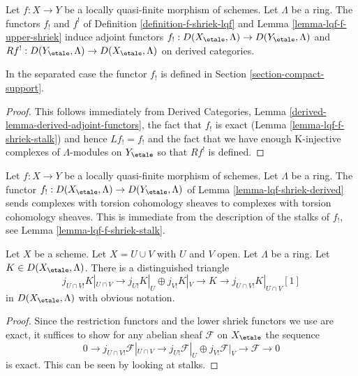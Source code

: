 \begin{lemma}
\label{lemma-lqf-shriek-derived}
Let $f : X \to Y$ be a locally quasi-finite morphism of schemes.
Let $\Lambda$ be a ring. The functors $f_!$ and $f^!$ of
Definition \ref{definition-f-shriek-lqf} and
Lemma \ref{lemma-lqf-f-upper-shriek}
induce adjoint functors $f_! : D(X_\etale, \Lambda) \to D(Y_\etale, \Lambda)$
and $Rf^! : D(Y_\etale, \Lambda) \to D(X_\etale, \Lambda)$
on derived categories.
\end{lemma}

\noindent
In the separated case the functor $f_!$ is defined in
Section \ref{section-compact-support}.

\begin{proof}
This follows immediately from
Derived Categories, Lemma \ref{derived-lemma-derived-adjoint-functors},
the fact that $f_!$ is exact (Lemma \ref{lemma-lqf-f-shriek-stalk})
and hence $Lf_! = f_!$
and the fact that we have enough K-injective complexes of $\Lambda$-modules
on $Y_\etale$ so that $Rf^!$ is defined.
\end{proof}

\begin{remark}
\label{remark-lqf-shriek-derived-torsion}
Let $f : X \to Y$ be a locally quasi-finite morphism of schemes. Let
$\Lambda$ be a ring. The functor
$f_! : D(X_\etale, \Lambda) \to D(Y_\etale, \Lambda)$ of
Lemma \ref{lemma-lqf-shriek-derived}
sends complexes with torsion cohomology sheaves
to complexes with torsion cohomology sheaves.
This is immediate from the description of the stalks of $f_!$,
see Lemma \ref{lemma-lqf-f-shriek-stalk}.
\end{remark}

\begin{lemma}
\label{lemma-mayer-vietoris-shriek}
Let $X$ be a scheme. Let $X = U \cup V$ with $U$ and $V$ open.
Let $\Lambda$ be a ring. Let $K \in D(X_\etale, \Lambda)$. There
is a distinguished triangle
$$
j_{U \cap V!}K|_{U \cap V} \to
j_{U!}K|_U \oplus j_{V!}K|_V \to K \to 
j_{U \cap V!}K|_{U \cap V}[1]
$$
in $D(X_\etale, \Lambda)$ with obvious notation.
\end{lemma}

\begin{proof}
Since the restriction functors and the lower shriek functors we use
are exact, it suffices to show for any abelian sheaf $\mathcal{F}$ on
$X_\etale$ the sequence
$$
0 \to j_{U \cap V!}\mathcal{F}|_{U \cap V} \to
j_{U!}\mathcal{F}|_U \oplus j_{V!}\mathcal{F}|_V \to \mathcal{F} \to 0
$$
is exact. This can be seen by looking at stalks.
\end{proof}

